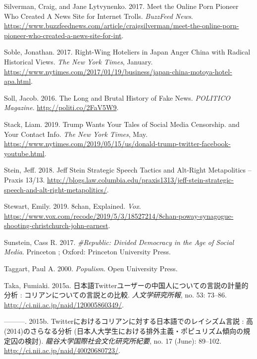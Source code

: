 \documentclass[10pt,british,A4paper,,openany]{memoir}
\begin{document}
\hypertarget{ref-silverman_meet_2017}{}
Silverman, Craig, and Jane Lytvynenko. 2017. Meet the Online Porn
Pioneer Who Created A News Site for Internet Trolls. \emph{BuzzFeed
News}.
\url{https://www.buzzfeednews.com/article/craigsilverman/meet-the-online-porn-pioneer-who-created-a-news-site-for-int}.

\hypertarget{ref-soble_right-wing_2017}{}
Soble, Jonathan. 2017. Right-Wing Hoteliers in Japan Anger China with
Radical Historical Views. \emph{The New York Times}, January.
\url{https://www.nytimes.com/2017/01/19/business/japan-china-motoya-hotel-apa.html}.

\hypertarget{ref-soll_long_2016}{}
Soll, Jacob. 2016. The Long and Brutal History of Fake News.
\emph{POLITICO Magazine}. \url{http://politi.co/2FaV5W9}.

\hypertarget{ref-stack_trump_2019}{}
Stack, Liam. 2019. Trump Wants Your Tales of Social Media Censorship.
and Your Contact Info. \emph{The New York Times}, May.
\url{https://www.nytimes.com/2019/05/15/us/donald-trump-twitter-facebook-youtube.html}.

\hypertarget{ref-stein_jeff_2018}{}
Stein, Jeff. 2018. Jeff Stein Strategic Speech Tactics and Alt-Right
Metapolitics -- Praxis 13/13.
\url{http://blogs.law.columbia.edu/praxis1313/jeff-stein-strategic-speech-and-alt-right-metapolitics/}.

\hypertarget{ref-stewart_8chan_2019}{}
Stewart, Emily. 2019. 8chan, Explained. \emph{Vox}.
\url{https://www.vox.com/recode/2019/5/3/18527214/8chan-poway-synagogue-shooting-christchurch-john-earnest}.

\hypertarget{ref-sunstein_republic:_2017}{}
Sunstein, Cass R. 2017. \emph{\#Republic: Divided Democracy in the Age
of Social Media}. Princeton ; Oxford: Princeton University Press.

\hypertarget{ref-taggart_populism_2000}{}
Taggart, Paul A. 2000. \emph{Populism}. Open University Press.

\hypertarget{ref-taka_twitter_2015}{}
Taka, Fumiaki. 2015a.
日本語Twitterユーザーの中国人についての言説の計量的分析 :
コリアンについての言説との比較. \emph{人文学研究所報}, no. 53: 73--86.
\url{http://ci.nii.ac.jp/naid/120005860349/}.

\hypertarget{ref-taka_twitter_2015-1}{}
---------. 2015b.
Twitterにおけるコリアンに対する日本語でのレイシズム言説 :
高(2014)のさらなる分析
(日本人大学生における排外主義・ポピュリズム傾向の規定囚の検討).
\emph{龍谷大学国際社会文化研究所紀要}, no. 17 (June): 89--102.
\url{http://ci.nii.ac.jp/naid/40020680723/}.
\end{document}
